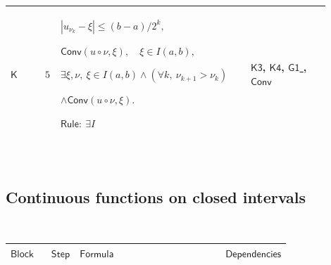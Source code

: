 \documentclass[12pt,reqno]{amsart}
\theoremstyle{blueplain}
\numberwithin{equation}{section}
\newlength{\FTCOneColumnBody}
\begin{document}
{\scriptsize \setlength{\parskip}{0pt}\nointerlineskip
\noindent 
\begin{tabular}{|@{}>{\centering\arraybackslash}m{0.10658\linewidth}|>{\centering\arraybackslash}m{0.03553\linewidth}|>{\centering\arraybackslash}m{0.52105\linewidth}|>{\centering\arraybackslash}m{0.23684\linewidth}|}
\hline
\hypertarget{proof:K5}{$\displaystyle \mathsf{K}$} & $\displaystyle 5$ & $%
\displaystyle |u_{\nu_k}-\xi|\le(b-a)/2^k,$\par$\displaystyle \mathsf{Conv}%
(u\circ\nu,\xi),\quad\xi\in I(a,b),$\par$\displaystyle \exists\xi,\nu,\
\xi\in I(a,b)\land(\forall k,\ \nu_{k+1}>\nu_k)$\par$\displaystyle \land%
\mathsf{Conv}(u\circ\nu,\xi).$\par$\displaystyle \mathsf{Rule}:\ \exists I$
& \hyperlink{proof:K3}{$\displaystyle \mathsf{K3}$}, \hyperlink{proof:K4}{$%
\displaystyle \mathsf{K4}$}, \hyperlink{proof:G1}{$\displaystyle \mathsf{G1}$%
}, \hyperlink{def:Conv}{$\displaystyle \mathsf{Conv}$} \\ \hline
\end{tabular}%
}

{\scriptsize \ }

\subsection{\protect\scriptsize Continuous functions on closed intervals}

{\scriptsize {\ }}

{\scriptsize \setlength{\parskip}{0pt}\nointerlineskip
\noindent 
\begin{tabular}{|@{}>{\centering\arraybackslash}m{\FTCOneColumnBody}|}
\hline
$\displaystyle \mathsf{ContinuousFunctionsOnClosedIntervals}$ \\ \hline
\end{tabular}%
}

{\scriptsize \setlength{\parskip}{0pt}\nointerlineskip
\noindent 
\begin{tabular}{|@{}>{\centering\arraybackslash}m{0.10658\linewidth}|>{\centering\arraybackslash}m{0.03553\linewidth}|>{\centering\arraybackslash}m{0.52105\linewidth}|>{\centering\arraybackslash}m{0.23684\linewidth}|}
\hline
$\displaystyle \mathsf{Block}$ & $\displaystyle \mathsf{Step}$ & $%
\displaystyle \mathsf{Formula}$ & $\displaystyle \mathsf{Dependencies}$ \\ 
\hline
\end{tabular}%
}
\end{document}
